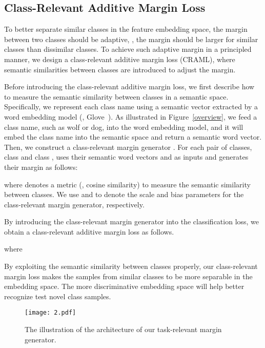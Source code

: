 \documentclass[10pt,twocolumn,letterpaper]{article}
\begin{document}
\subsection{Class-Relevant Additive Margin Loss}
\label{sect:class_aware}

To better separate similar classes in the feature embedding space, the margin between two classes should be adaptive, \ie, the margin should be larger for similar classes than dissimilar classes. To achieve such adaptive margin in a principled manner, we design a class-relevant additive margin loss (CRAML), where semantic similarities between classes are introduced to adjust the margin. 

Before introducing the class-relevant additive margin loss, we first describe how to measure the semantic similarity between classes in a semantic space. Specifically, we represent each class name using a semantic vector extracted by
a word embedding model (\eg, Glove~\cite{glove}). As illustrated in Figure~\ref{overview}, we feed  a class name, such as wolf or dog, into the word embedding model, and it will embed the class name into the semantic space and return a semantic word vector. Then, we construct a class-relevant margin generator . For each pair of classes, class  and class ,  uses their semantic word vectors  and  as inputs and generates their margin  as follows:

where 
 denotes a metric (\eg, cosine similarity) to measure the semantic similarity between classes.
We use  and  to denote the scale and bias parameters for the class-relevant margin generator, respectively.

By introducing the class-relevant margin generator into the classification loss, we obtain a class-relevant additive margin loss as follows.

where 


By exploiting the semantic similarity between classes properly, our class-relevant margin loss makes the samples from similar classes to be more separable in the embedding space. The more discriminative embedding space will help better recognize test novel class samples.

\begin{figure*}[t]
\begin{center}
\texttt{[image: 2.pdf]}
\end{center}
\vspace{-0.1in}
\caption{The illustration of the architecture of our task-relevant margin generator.}
\label{arch_trm}
\end{figure*}
\end{document}
